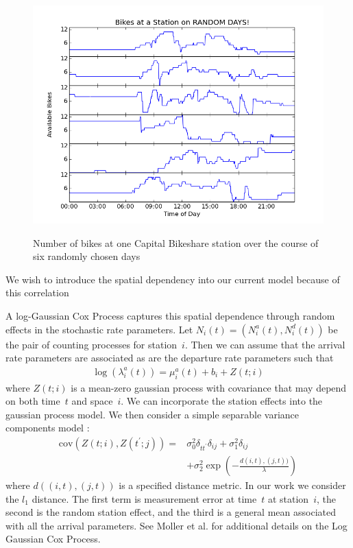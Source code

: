 \documentclass{acm_proc_article-sp}
\begin{document}
\begin{figure} [!h]
\caption{Number of bikes at one Capital Bikeshare station over the course of six randomly chosen days}
\centering
\includegraphics[scale = 0.4]{station_54_6_days.png}
\label{fig:station_54_6_days}
\end{figure}

We wish to introduce the spatial dependency into our current model because of this correlation 

A log-Gaussian Cox Process captures this spatial dependence through random effects in the stochastic rate parameters.  Let $N_i (t) = (N_i^{a} (t), N_i^{d} (t))$ be the pair of counting processes for station~$i$.  Then we can assume that the arrival rate parameters are associated as are the departure rate parameters such that
\begin{align}
\log \left( \lambda_i^{a} (t) \right) = \mu^{a}_i(t) + b_i + Z(t;i)
\end{align}
\noindent where $Z(t;i)$ is a mean-zero gaussian process with covariance that may depend on both time~$t$ and space~$i$.  We can incorporate the station effects into the gaussian process model.  We then consider a simple separable variance components model :
\begin{align*}
\text{cov} ( Z(t;i) , Z(t^\prime; j) ) =& \sigma_0^2 \delta_{t t^\prime}  \delta_{i j} + \sigma_1^2  \delta_{i j} \\
&+ \sigma_2^2 \exp \left( -\frac{ d(i,t),(j,t)) }{\lambda} \right)
\end{align*}
\noindent where $d ( (i,t) , (j,t))$ is a specified distance metric. In our work we consider the $l_1$ distance.  The first term is measurement error at time~$t$ at station~$i$, the second is the random station effect, and the third is a general mean associated with all the arrival parameters.  See Moller et al. \cite{moller:coxproc} for additional details on the Log Gaussian Cox Process.
\end{document}
